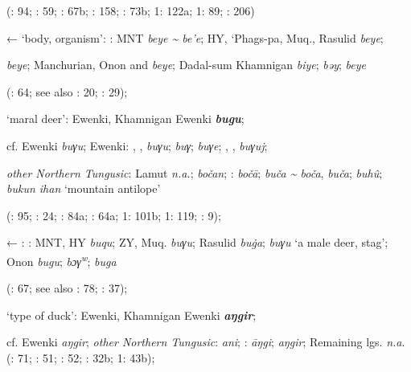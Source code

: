 \documentclass[output=paper,colorlinks,citecolor=brown]{langscibook}
\begin{document}
    (\citealt{Castrén1856}: 94; \citealt{Janhunen1991}: 59; \citealt{Dorji1998}: 67b; \citealt{Chaoke2014a}: 158; \citealt{Vasilevic1958}: 73b; \citealt{Cincius1975B} 1: 122a; \citealt{Hauer1952} 1: 89; \citealt{Zikmundová2013a}: 206)

    ←  ‘body, organism’: : MNT \textit{beye {\textasciitilde} be’e}; HY, ‘Phags-pa, Muq., Rasulid \textit{beye};

     \textit{beye}; Manchurian, Onon and   \textit{beye}; Dadal-sum Khamnigan \textit{biye};  \textit{bǝy};  \textit{beye}
    
    (\citealt{Khabtagaeva2017}: 64; see also \citealt{Doerfer1985}: 20; \citealt{Rozycki1994}: 29);

    \ex ‘maral deer’:  Ewenki, Khamnigan Ewenki \textbf{\textit{bugu}};

    cf.  Ewenki \textit{buγu};  Ewenki: , ,  \textit{buγu};  \textit{buγ};  \textit{buγe}; , ,  \textit{buγuj};

    \textit{other Northern Tungusic}: Lamut \textit{n.a.};  \textit{bočan}; \textit{}:  \textit{bočā};  \textit{buča {\textasciitilde} boča},  \textit{buča};  \textit{buhû};  \textit{bukun ihan} ‘mountain antilope’
    
    (\citealt{Castrén1856}: 95; \citealt{Janhunen1991}: 24; \citealt{Dorji1998}: 84a; \citealt{Vasilevic1958}: 64a; \citealt{Cincius1975B} 1: 101b; \citealt{Hauer1952} 1: 119; \citealt{Stary1990}: 9);

    ← : : MNT, HY \textit{buqu}; ZY, Muq. \textit{buγu}; Rasulid \textit{bu\.{g}a};  \textit{buγu} ‘a male deer, stag’; Onon  \textit{bugu};  \textit{bɔγ\textsuperscript{w}};  \textit{buga}
    
    (\citealt{Khabtagaeva2017}: 67; see also \citealt{Doerfer1985}: 78; \citealt{Rozycki1994}: 37);

    \ex ‘type of duck’:  Ewenki, Khamnigan Ewenki \textbf{\textit{aŋgir}};

    cf.  Ewenki \textit{aŋgir}; \textit{other Northern Tungusic}:  \textit{ani}; \textit{}:  \textit{āŋgi};  \textit{aŋgir}; Remaining lgs. \textit{n.a}. (\citealt{Castrén1856}: 71; \citealt{Janhunen1991}: 51; \citealt{Chaoke2014bB}: 52; \citealt{Vasilevic1958}: 32b; \citealt{Cincius1975B} 1: 43b);
\end{document}

